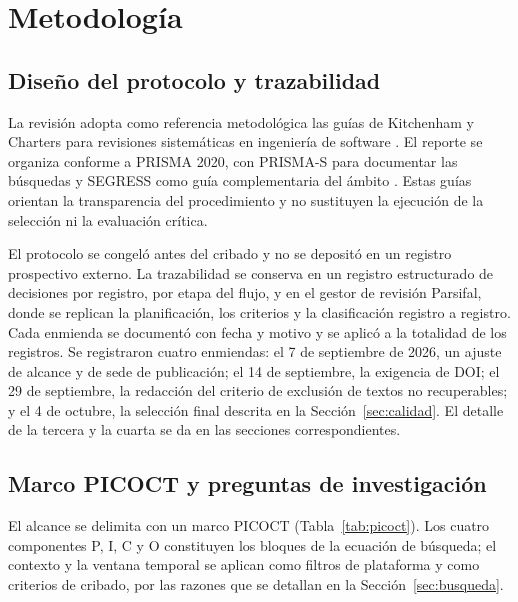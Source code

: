 \documentclass[pdflatex,sn-mathphys-num]{sn-jnl}
\theoremstyle{thmstyleone}
\theoremstyle{thmstyletwo}
\theoremstyle{thmstylethree}
\begin{document}
\section{Metodología}\label{sec:metodo}

\subsection{Diseño del protocolo y trazabilidad}

La revisión adopta como referencia metodológica las guías de Kitchenham y Charters para revisiones sistemáticas en ingeniería de software \cite{kitchenham2007guidelines}. El reporte se organiza conforme a PRISMA 2020, con PRISMA-S para documentar las búsquedas y SEGRESS como guía complementaria del ámbito \cite{page2021prisma,rethlefsen2021prismas,kitchenham2023segress}. Estas guías orientan la transparencia del procedimiento y no sustituyen la ejecución de la selección ni la evaluación crítica.

El protocolo se congeló antes del cribado y no se depositó en un registro prospectivo externo. La trazabilidad se conserva en un registro estructurado de decisiones por registro, por etapa del flujo, y en el gestor de revisión Parsifal, donde se replican la planificación, los criterios y la clasificación registro a registro. Cada enmienda se documentó con fecha y motivo y se aplicó a la totalidad de los registros. Se registraron cuatro enmiendas: el 7 de septiembre de 2026, un ajuste de alcance y de sede de publicación; el 14 de septiembre, la exigencia de DOI; el 29 de septiembre, la redacción del criterio de exclusión de textos no recuperables; y el 4 de octubre, la selección final descrita en la Sección~\ref{sec:calidad}. El detalle de la tercera y la cuarta se da en las secciones correspondientes.

\subsection{Marco PICOCT y preguntas de investigación}

El alcance se delimita con un marco PICOCT (Tabla~\ref{tab:picoct}). Los cuatro componentes P, I, C y O constituyen los bloques de la ecuación de búsqueda; el contexto y la ventana temporal se aplican como filtros de plataforma y como criterios de cribado, por las razones que se detallan en la Sección~\ref{sec:busqueda}.
\end{document}
